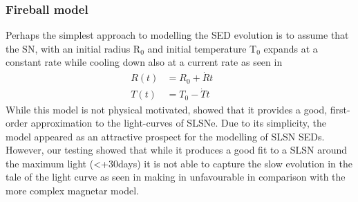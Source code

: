 \subsubsection{Fireball model}
Perhaps the simplest approach to modelling the SED evolution is to assume that the SN, with an initial radius R$_{0}$ and initial temperature T$_{0}$ expands at a constant rate while cooling down also at a current rate as seen in 
\begin{align}
\label{eq:Howell}
R(t) &= R_0 + \dot{R}t &&\\
T(t) &= T_0 - \dot{T}t &&
\end{align}
\noindent While this model is not physical motivated, \citet{Howell2013} showed that it provides a good, first-order approximation to the light-curves of SLSNe. Due to its simplicity, the model appeared as an attractive prospect for the modelling of SLSN SEDs. However, our testing showed that while it produces a good fit to a SLSN around the maximum light (<+30days) it is not able to capture the slow evolution in the tale of the light curve as seen in  making in unfavourable in comparison with the more complex magnetar model.

